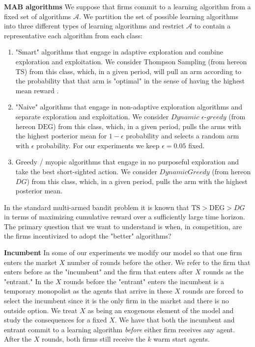 \documentclass[letterpaper]{article}
\theoremstyle{definition}
\newcommand{\TS}{\mathrm{TS}}
\newcommand{\DEG}{\mathrm{DEG}}
\begin{document}
\noindent \textbf{MAB algorithms} We suppose that firms commit to a learning algorithm from a fixed set of algorithms $\mathcal{A}$. We partition the set of possible learning algorithms into three different types of learning algorithms and restrict $\mathcal{A}$ to contain a representative each algorithm from each class:
\begin{enumerate}
\item "Smart" algorithms that engage in adaptive exploration and combine exploration and exploitation. We consider Thompson Sampling (from hereon $\TS$) from this class, which, in a given period, will pull an arm according to the probability that that arm is "optimal" in the sense of having the highest mean reward \cite{agrawal2012analysis}.
\item "Naive" algorithms that engage in non-adaptive exploration algorithms and separate exploration and exploitation. We consider $Dynamic$ $\epsilon$-$greedy$ (from hereon $\DEG$) from this class, which, in a given period, pulls the arms with the highest posterior mean for $1 - \epsilon$ probability and selects a random arm with $\epsilon$ probability. For our experiments we keep $\epsilon = 0.05$ fixed.
\item Greedy / myopic algorithms that engage in no purposeful exploration and take the best short-sighted action. We consider $DynamicGreedy$ (from hereon $DG$) from this class, which, in a given period, pulls the arm with the highest posterior mean.
\end{enumerate}

In the standard multi-armed bandit problem it is known that $\TS > \DEG > DG$ in terms of maximizing cumulative reward over a sufficiently large time horizon. The primary question that we want to understand is when, in competition, are the firms incentivized to adopt the "better" algorithms?

\noindent \textbf{Incumbent} In some of our experiments we modify our model so that one firm enters the market $X$ number of rounds before the other. We refer to the firm that enters before as the "incumbent" and the firm that enters after $X$ rounds as the "entrant." In the $X$ rounds before the "entrant" enters the incumbent is a temporary monopolist as the agents that arrive in these $X$ rounds are forced to select the incumbent since it is the only firm in the market and there is no outside option. We treat $X$ as being an exogenous element of the model and study the consequences for a fixed $X$. We have that both the incumbent and entrant commit to a learning algorithm \textit{before} either firm receives any agent. After the $X$ rounds, both firms still receive the $k$ warm start agents.
\end{document}

